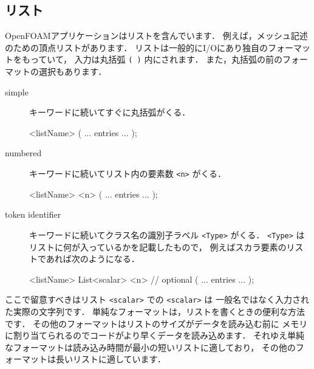 \subsection{リスト}
\label{ssec:4.2.4}
OpenFOAMアプリケーションはリストを含んでいます．
例えば，メッシュ記述のための頂点リストがあります．
リストは一般的にI/Oにあり独自のフォーマットをもっていて，
入力は丸括弧 \verb|( )| 内にされます．
また，丸括弧の前のフォーマットの選択もあります．
\begin{description}
 \item[simple]
            キーワードに続いてすぐに丸括弧がくる．
\begin{OFverbatim}[file]
    <listName>
    (
        ... entries ...
    );
\end{OFverbatim}
 \item[numbered]
            キーワードに続いてリスト内の要素数 \verb|<n>| がくる．
\begin{OFverbatim}[file]
    <listName>
    <n>
    (
        ... entries ...
    );
\end{OFverbatim}
 \item[token identifier]
            キーワードに続いてクラス名の識別子ラベル \verb|<Type>| がくる．
            \verb|<Type>| はリストに何が入っているかを記載したもので，
            例えばスカラ要素のリストであれば次のようになる．
\begin{OFverbatim}[file]
    <listName>
    List<scalar>
    <n>        // optional
    (
        ... entries ...
    );
\end{OFverbatim}
\end{description}
ここで留意すべきはリスト \verb|<scalar>| での \verb|<scalar>| は
一般名ではなく入力された実際の文字列です．
単純なフォーマットは，リストを書くときの便利な方法です．
その他のフォーマットはリストのサイズがデータを読み込む前に
メモリに割り当てられるのでコードがより早くデータを読み込めます．
それゆえ単純なフォーマットは読み込み時間が最小の短いリストに適しており，
その他のフォーマットは長いリストに適しています．


